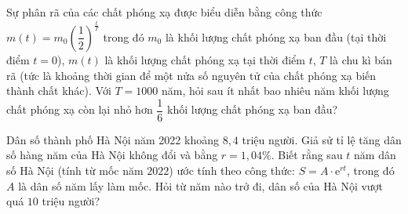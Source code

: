 \begin{bt}
	Sự phân rã của các chất phóng xạ được biểu diễn bằng công thức $m(t)=m_0\left(\dfrac{1}{2}\right)^{\tfrac{t}{T}}$ trong đó $m_0$ là khối lượng chất phóng xạ ban đầu (tại thời điểm $t = 0$), $m(t)$ là khối lượng chất phóng xạ tại thời điểm $t$, $T$ là chu kì bán rã (tức là khoảng thời gian để một nửa số nguyên tử của chất phóng xạ biến thành chất khác). Với $T=1000$ năm, hỏi sau ít nhất bao nhiêu năm khối lượng chất phóng xạ còn lại nhỏ hơn $\dfrac{1}{6}$ khối lượng chất phóng xạ ban đầu?
\end{bt}

\begin{bt}
	Dân số thành phố Hà Nội năm 2022 khoảng $8{,}4$ triệu người. Giả sử tỉ lệ tăng dân số hàng năm của Hà Nội không đổi và bằng $r=1{,}04\%$. Biết rằng sau $t$ năm dân số Hà Nội (tính từ mốc năm $2022$) ước tính theo công thức: $S = A\cdot \mathrm{e}^{rt}$, trong đó $A$ là dân số năm lấy làm mốc. Hỏi từ năm nào trở đi, dân số của Hà Nội vượt quá $10$ triệu người?
\end{bt}

